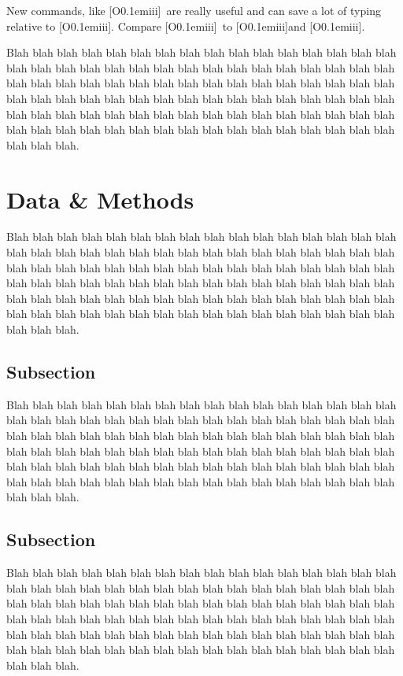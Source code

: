 \documentclass[twocolumn]{aastex61}
\newcommand{\OIII}{[\hbox{{\rm O}\kern 0.1em{\sc iii}}]}
\begin{document}
New commands, like \OIII\ are really useful and can save a lot of typing relative to [\hbox{{\rm O}\kern 0.1em{\sc iii}}].
Compare \OIII\ to \OIII and \OIII.

Blah blah blah blah blah blah blah blah blah blah blah blah blah blah blah blah blah blah blah blah blah blah blah blah blah blah blah blah blah blah blah blah blah blah blah blah blah blah blah blah blah blah blah blah blah blah blah blah blah blah blah blah blah blah blah blah blah blah blah blah blah blah blah blah blah blah blah blah blah blah blah blah blah blah blah blah blah blah blah blah blah blah blah blah blah blah blah blah blah blah blah blah blah blah blah blah blah blah blah.


\section{Data \& Methods} \label{Methods}

Blah blah blah blah blah blah blah blah blah blah blah blah blah blah blah blah blah blah blah blah blah blah blah blah blah blah blah blah blah blah blah blah blah blah blah blah blah blah blah blah blah blah blah blah blah blah blah blah blah blah blah blah blah blah blah blah blah blah blah blah blah blah blah blah blah blah blah blah blah blah blah blah blah blah blah blah blah blah blah blah blah blah blah blah blah blah blah blah blah blah blah blah blah blah blah blah blah blah blah.


\subsection{Subsection}

Blah blah blah blah blah blah blah blah blah blah blah blah blah blah blah blah blah blah blah blah blah blah blah blah blah blah blah blah blah blah blah blah blah blah blah blah blah blah blah blah blah blah blah blah blah blah blah blah blah blah blah blah blah blah blah blah blah blah blah blah blah blah blah blah blah blah blah blah blah blah blah blah blah blah blah blah blah blah blah blah blah blah blah blah blah blah blah blah blah blah blah blah blah blah blah blah blah blah blah.


\subsection{Subsection}

Blah blah blah blah blah blah blah blah blah blah blah blah blah blah blah blah blah blah blah blah blah blah blah blah blah blah blah blah blah blah blah blah blah blah blah blah blah blah blah blah blah blah blah blah blah blah blah blah blah blah blah blah blah blah blah blah blah blah blah blah blah blah blah blah blah blah blah blah blah blah blah blah blah blah blah blah blah blah blah blah blah blah blah blah blah blah blah blah blah blah blah blah blah blah blah blah blah blah blah.
\end{document}

